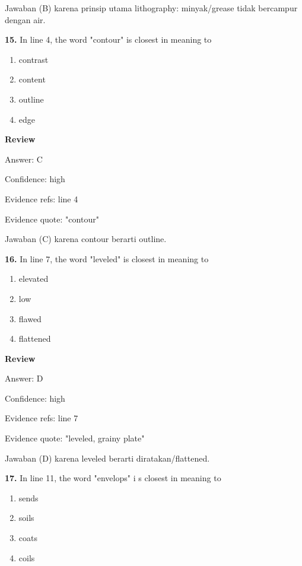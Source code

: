 \documentclass[12pt]{article}
\begin{document}
Jawaban (B) karena prinsip utama lithography: minyak/grease tidak bercampur dengan air.\par
\endgroup
\par
\vspace{0.25\baselineskip}
\noindent\textbf{15.} In line 4, the word "contour" is closest in meaning to
\begin{enumerate}[label=(\Alph*),leftmargin=*,itemsep=0.2em]
\item contrast
\item content
\item outline
\item edge
\end{enumerate}
\par
\begingroup
\setlength{\parskip}{0pt}
\setlength{\parindent}{0pt}
\textbf{Review}\par
Answer: C\par
Confidence: high\par
Evidence refs: line 4\par
Evidence quote: "contour"\par
Jawaban (C) karena contour berarti outline.\par
\endgroup
\par
\vspace{0.25\baselineskip}
\noindent\textbf{16.} In line 7, the word "leveled" is closest in meaning to
\begin{enumerate}[label=(\Alph*),leftmargin=*,itemsep=0.2em]
\item elevated
\item low
\item flawed
\item flattened
\end{enumerate}
\par
\begingroup
\setlength{\parskip}{0pt}
\setlength{\parindent}{0pt}
\textbf{Review}\par
Answer: D\par
Confidence: high\par
Evidence refs: line 7\par
Evidence quote: "leveled, grainy plate"\par
Jawaban (D) karena leveled berarti diratakan/flattened.\par
\endgroup
\par
\vspace{0.25\baselineskip}
\noindent\textbf{17.} In line 11, the word "envelops" i s closest in meaning to
\begin{enumerate}[label=(\Alph*),leftmargin=*,itemsep=0.2em]
\item sends
\item soils
\item coats
\item coils
\end{enumerate}
\end{document}
